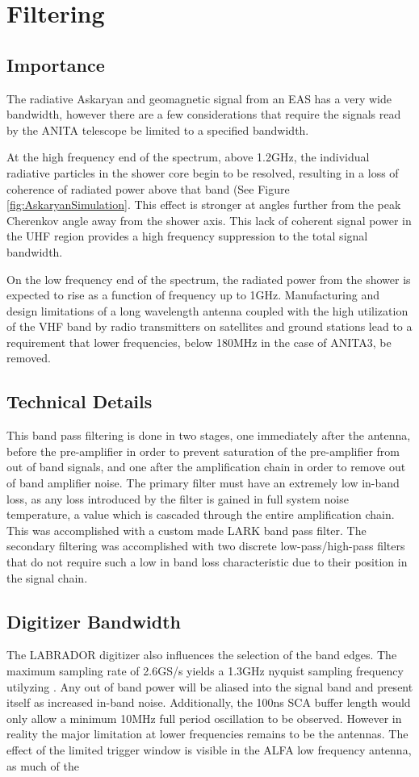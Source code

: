 	
\section{Filtering}
	\subsection{Importance}
		The radiative Askaryan and geomagnetic signal from an EAS has a very wide bandwidth, however there are a few considerations that require the signals read by the ANITA telescope be limited to a specified bandwidth.
		
		At the high frequency end of the spectrum, above 1.2GHz, the individual radiative particles in the shower core begin to be resolved, resulting in a loss of coherence of radiated power above that band (See Figure \ref{fig:AskaryanSimulation}.  This effect is stronger at angles further from the peak Cherenkov angle away from the shower axis.\cite{PhysRevD.84.103003}  This lack of coherent signal power in the UHF region provides a high frequency suppression to the total signal bandwidth.

		On the low frequency end of the spectrum, the radiated power from the shower is expected to rise as a function of frequency up to 1GHz.  Manufacturing and design limitations of a long wavelength antenna coupled with the high utilization of the VHF band by radio transmitters on satellites and ground stations lead to a requirement that lower frequencies, below 180MHz in the case of ANITA3, be removed.
		
	\subsection{Technical Details}
		This band pass filtering is done in two stages, one immediately after the antenna, before the pre-amplifier in order to prevent saturation of the pre-amplifier from out of band signals, and one after the amplification chain in order to remove out of band amplifier noise.  The primary filter must have an extremely low in-band loss, as any loss introduced by the filter is gained in full system noise temperature, a value which is cascaded through the entire amplification chain.  This was accomplished with a custom made LARK band pass filter.  The secondary filtering was accomplished with two discrete low-pass/high-pass filters that do not require such a low in band loss characteristic due to their position in the signal chain.
		
	\subsection{Digitizer Bandwidth}
		The LABRADOR digitizer also influences the selection of the band edges.  The maximum sampling rate of 2.6GS/s yields a 1.3GHz nyquist sampling frequency utilyzing .  Any out of band power will be aliased into the signal band and present itself as increased in-band noise.  Additionally, the 100ns SCA buffer length would only allow a minimum 10MHz full period oscillation to be observed.  However in reality the major limitation at lower frequencies remains to be the antennas.  The effect of the limited trigger window is visible in the ALFA low frequency antenna, as much of the 
		
